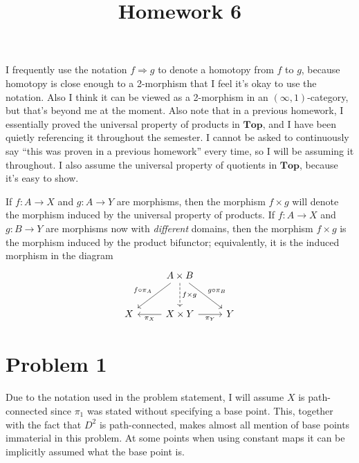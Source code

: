 \documentclass[11pt, letterpaper]{article}
\title{Homework 6}
\begin{document}
\makeproblem

\begin{note}
	I frequently use the notation $f\Rightarrow g$ to denote a homotopy from $f$ to $g$, because homotopy is close enough to a 2-morphism that I feel it's okay to use the notation. Also I think it can be viewed as a 2-morphism in an $(\infty ,1)$-category, but that's beyond me at the moment. Also note that in a previous homework, I essentially proved the universal property of products in $\mathbf{Top} $, and I have been quietly referencing it throughout the semester. I cannot be asked to continuously say ``this was proven in a previous homework'' every time, so I will be assuming it throughout. I also assume the universal property of quotients in $\mathbf{Top} $, because it's easy to show.
\end{note}

\begin{notation}
	If $f : A \to X$ and $g : A \to Y$ are morphisms, then the morphism $f\times g$ will denote the morphism induced by the universal property of products. If $f : A \to X$ and $g : B \to Y$ are morphisms now with \emph{different} domains, then the morphism $f\times g$ is the morphism induced by the product bifunctor; equivalently, it is the induced morphism in the diagram
	\[\begin{tikzcd}[row sep = 2.5em, column sep = 2.5em]
	 & A\times B \ar[" f\circ \pi _A "', dl] \ar[" g\circ \pi _B ", dr]\ar[" f\times g ", dashed, d]  &  \\
	X & X\times Y\ar[" \pi_X ", l] \ar[" \pi _Y "', r]  & Y
	\end{tikzcd}\]
\end{notation}


\section*{Problem 1}
Due to the notation used in the problem statement, I will assume $X$ is path-connected since $\pi _1$ was stated without specifying a base point. This, together with the fact that $D^2$ is path-connected, makes almost all mention of base points immaterial in this problem. At some points when using constant maps it can be implicitly assumed what the base point is.
\end{document}
